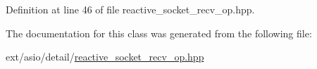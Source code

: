 Definition at line 46 of file reactive\+\_\+socket\+\_\+recv\+\_\+op.\+hpp.



The documentation for this class was generated from the following file\+:\begin{DoxyCompactItemize}
\item 
ext/asio/detail/\hyperlink{reactive__socket__recv__op_8hpp}{reactive\+\_\+socket\+\_\+recv\+\_\+op.\+hpp}\end{DoxyCompactItemize}
